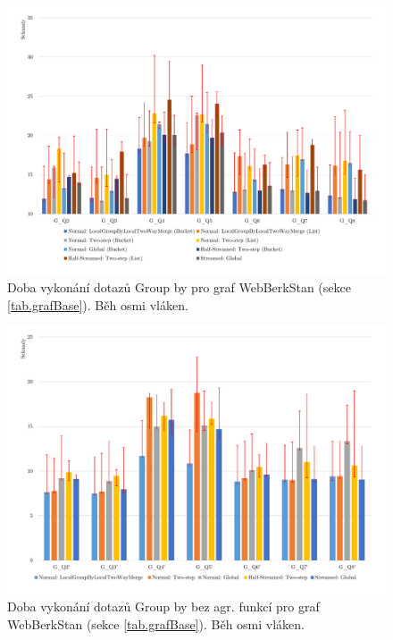 \begin{figure}[!htp]
\includegraphics[width=\linewidth]{../img/webberkstanGroupByPar.pdf}\centering
\caption{Doba vykonání dotazů Group by pro graf WebBerkStan (sekce \ref{tab.grafBase}). Běh osmi vláken.}
\label{figure.webberkstanGroupByPar}
\end{figure}
\begin{figure}[!htp]
\includegraphics[width=\linewidth]{../img/webberkstanGroupByParNoAgg.pdf}\centering
\caption{Doba vykonání dotazů Group by bez agr. funkcí pro graf WebBerkStan (sekce \ref{tab.grafBase}). Běh osmi vláken.}
\label{figure.webberkstanGroupByParNoAgg}
\end{figure}

